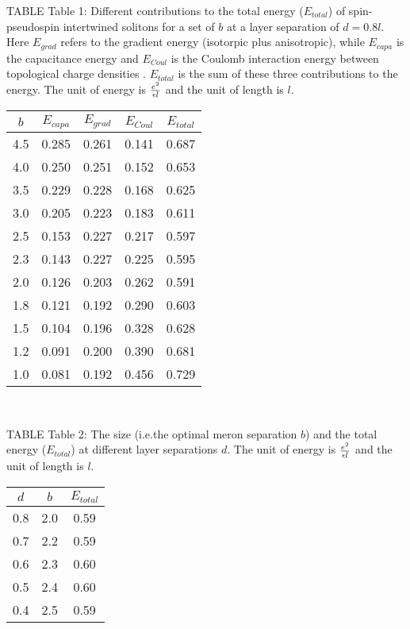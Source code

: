 \newpage
\bc
TABLE
\ec 
\noindent Table 1: Different contributions to the total energy ($E_{total}$)
 of spin-pseudospin intertwined 
solitons for a set of $b$ at a layer separation of $d = 0.8l$.
Here $E_{grad}$ refers to the gradient energy  
(isotorpic plus anisotropic), while
$E_{capa}$  is the capacitance 
energy and $E_{Coul}$ is the Coulomb interaction energy
between  topological charge densities . $E_{total}$ is the 
sum of these three contributions to the energy. The unit of 
energy is $e^2 \over \epsilon l$ and the unit of length is $l$.  

\begin{center}
\begin{tabular}{|c|c|c|c|c|}
\hline
$b$ &  $E_{capa}$   &   $E_{grad}$ & $E_{Coul}$ & $E_{total}$  
 \\
\hline
4.5  & 0.285 & 0.261 & 0.141 & 0.687  \\
\hline
4.0  & 0.250  & 0.251 & 0.152 & 0.653 \\
\hline
3.5  & 0.229  & 0.228 & 0.168 & 0.625 \\
\hline
3.0  & 0.205  & 0.223 &  0.183 & 0.611 \\
\hline
2.5   & 0.153 & 0.227 & 0.217 & 0.597 \\
\hline
2.3   & 0.143 & 0.227 & 0.225 & 0.595 \\
\hline 
2.0 & 0.126 & 0.203 & 0.262 & 0.591 \\
\hline 
1.8 & 0.121 & 0.192 & 0.290 & 0.603 \\
\hline
1.5 & 0.104 & 0.196 & 0.328 & 0.628 \\
\hline 
1.2 & 0.091 & 0.200 & 0.390 & 0.681 \\
\hline 
1.0 & 0.081 & 0.192 & 0.456 & 0.729 \\
\hline
\end{tabular}\\
\end{center}

\newpage
\bc
TABLE
\ec 
\noindent Table 2: 
The size (i.e.the optimal meron separation $b$) and the total energy
 ($E_{total}$) at different layer separations $d$. The unit
of energy is $e^2 \over \epsilon l$ and the unit of length is 
$l$.
\begin{center}
\begin{tabular}{|c|c|c|}
\hline
$d$ &  $b$   &  $E_{total}$  
 \\
\hline
0.8  & 2.0 & 0.59   \\
\hline
0.7  & 2.2  & 0.59  \\
\hline
0.6  & 2.3  & 0.60  \\
\hline
0.5  & 2.4  & 0.60 \\
\hline
0.4   & 2.5 & 0.59 \\
\hline
\end{tabular}\\
\end{center}

